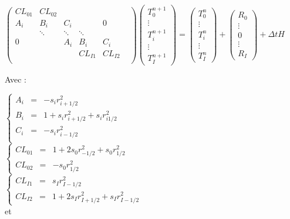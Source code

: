 \documentclass[legalpaper,12pt]{article}
\begin{document}
	\begin{math}
		\begin{pmatrix}
			CL_{01} & CL_{02} &  & &  \\
			A_{i} & B_{i}& C_{i} &  & 0&\\
			&\ddots & \ddots & \ddots & &\\
			0&&A_{i}&B_{i}&C_{i}\\
			&&&CL_{I1}&CL_{I2}\\
		\end{pmatrix} 
		\begin{pmatrix}
			T_{0}^{n+1}\\
			\vdots\\
			T_{i}^{n+1}\\
			\vdots\\
			T_{I}^{n+1}
		\end{pmatrix}
		=
		\begin{pmatrix}
			T_{0}^{n}\\
			\vdots\\
			T_{i}^{n}\\
			\vdots\\
			T_{I}^{n}
		\end{pmatrix}
		+
		\begin{pmatrix}
			R_{0}\\
			\vdots\\
			0\\
			\vdots\\
			R_{I}
		\end{pmatrix}
		+ \Delta t H
	\end{math}
	
	Avec : \newline
	
	\noindent
	\begin{math}
		\left\{ \begin{matrix}
			A_{i} & = &-s_{i} r_{i+1/2}^{2}\\
			B_{i} & = & 1 + s_{i} r_{i+1/2}^{2} + s_{i} r_{i1/2}^{2}\\
			C_{i} & = & -s_{i} r_{i-1/2}^{2}\\
		\end{matrix}
		\right.
	\end{math}
	\\[1cm]
	\noindent
	\begin{math}
		\left\{ \begin{matrix}
			CL_{01} & = & 1 + 2s_{0} r_{-1/2}^{2} + s_{0}r_{1/2}^{2}\\
			CL_{02} & = & -s_{0}r_{1/2}^{2}
		\end{matrix}
		\right.
	\end{math}
	\\[1cm]
	\noindent
	\begin{math}
		\left\{ \begin{matrix}
			CL_{I1} & = & s_{I}r_{I-1/2}^{2} \\
			CL_{I2} & = &  1 + 2s_{I} r_{I+1/2}^{2} + s_{I}r_{I-1/2}^{2}
		\end{matrix}
		\right.
	\end{math}
	\\[1cm]
	et\newline
	
\end{document}
